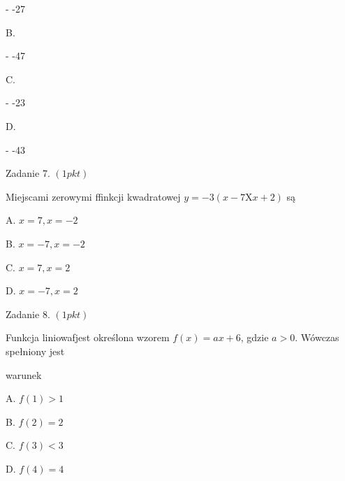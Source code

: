 \documentclass[a4paper,12pt]{article}
\begin{document}
- -27

B.

- -47

C.

- -23

D.

- -43

Zadanie 7. $(1pkt)$

Miejscami zerowymi ffinkcji kwadratowej $y=-3(x-7\mathrm{X}x+2)$ są

A. $x=7, x=-2$

B. $x=-7, x=-2$

C. $x=7, x=2$

D. $x=-7, x=2$

Zadanie 8. $(1pkt)$

Funkcja liniowafjest określona wzorem $f(x)=ax+6$, gdzie $a>0$. Wówczas spełniony jest

warunek

A. $f(1)>1$

B. $f(2)=2$

C. $f(3)<3$

D. $f(4)=4$
\end{document}
